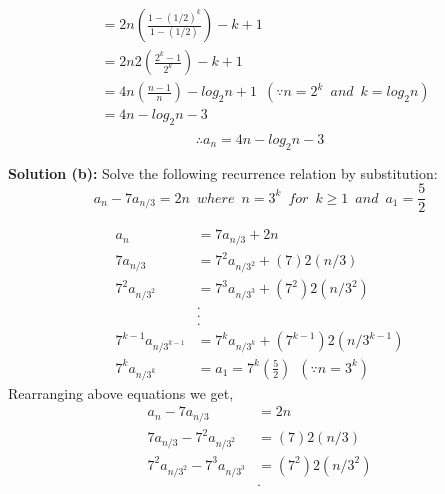 \documentclass{article}
\begin{document}
\begin{flushleft}
\begin{align*}
            & =2n(\frac{1-(1/2)^k}{1-(1/2)})-k+1                                                  \\
            & =2n2(\frac{2^k-1}{2^k})-k+1                                                         \\
            & =4n(\frac{n-1}{n})-log_2n+1\enspace (\because n=2^k \enspace and \enspace k=log_2n) \\
            & =4n-log_2n-3                                                                        \\
    \end{align*}
    $$\therefore a_n=4n-log_2n-3$$


    \begin{theorem}
       \textbf{Solution (b): } Solve the following recurrence relation by substitution:\\
        $$a_n-7a_{n/3}=2n \enspace where \enspace n=3^k \enspace for \enspace k\geq1 \enspace and \enspace a_1=\frac{5}{2}$$
    \end{theorem}
    \begin{align*}
        a_n                  & =7a_{n/3}+2n                                   \\
        7a_{n/3}             & =7^2a_{n/3^2}+(7)2(n/3)                        \\
        7^2a_{n/3^2}         & =7^3a_{n/3^3}+(7^2)2(n/3^2)                    \\
                             & .                                              \\
                             & .                                              \\
                             & .                                              \\
        7^{k-1}a_{n/3^{k-1}} & =7^ka_{n/3^k}+(7^{k-1})2(n/3^{k-1})            \\
        7^{k}a_{n/3^k}       & =a_1=7^k(\frac{5}{2})\enspace (\because n=3^k)
    \end{align*}
    Rearranging above equations we get,\\
    \begin{align*}
        a_n-7a_{n/3}                      & =2n                    \\
        7a_{n/3}-7^2a_{n/3^2}             & =(7)2(n/3)             \\
        7^2a_{n/3^2}-7^3a_{n/3^3}         & =(7^2)2(n/3^2)         \\
                                          & .                      \\

\end{align*}
\end{flushleft}
\end{document}
